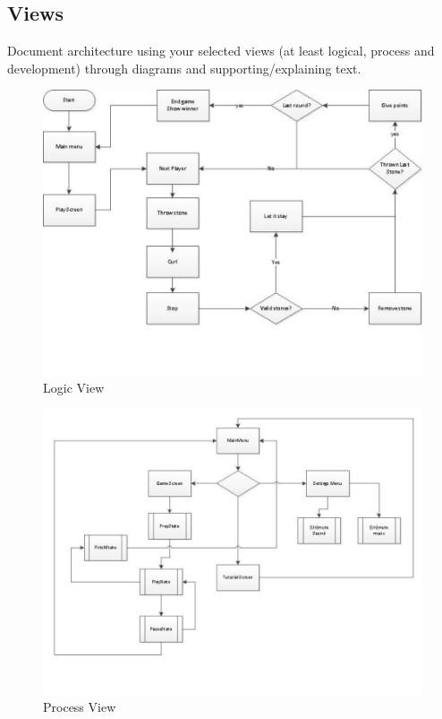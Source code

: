 \subsection{Views}

Document architecture using your selected views (at least logical, process and development) through diagrams and supporting/explaining text.	

\begin{figure}[ht!]
	\centering
	\includegraphics[width=150mm]{view.jpg}
	\caption{Logic View}
	\label{fig:view}
\end{figure}

\newpage
\begin{figure}[ht!]
	\centering
	\includegraphics[width=150mm]{viewpoint.jpg}
	\caption{Process View}
	\label{fig:viewpoint}
\end{figure}
